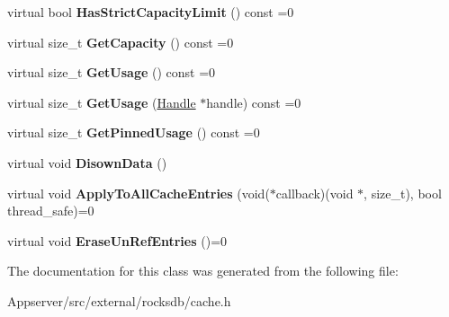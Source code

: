 \begin{DoxyCompactItemize}
\item 
virtual bool {\bfseries Has\+Strict\+Capacity\+Limit} () const =0\hypertarget{classrocksdb_1_1Cache_ae54a9d537e7f71412a0c77f5aef21746}{}\label{classrocksdb_1_1Cache_ae54a9d537e7f71412a0c77f5aef21746}

\item 
virtual size\+\_\+t {\bfseries Get\+Capacity} () const =0\hypertarget{classrocksdb_1_1Cache_accff305fc4e6553a09fe543b7fed62d4}{}\label{classrocksdb_1_1Cache_accff305fc4e6553a09fe543b7fed62d4}

\item 
virtual size\+\_\+t {\bfseries Get\+Usage} () const =0\hypertarget{classrocksdb_1_1Cache_ab37eee9208f9fee29c929e47e3f9d9b8}{}\label{classrocksdb_1_1Cache_ab37eee9208f9fee29c929e47e3f9d9b8}

\item 
virtual size\+\_\+t {\bfseries Get\+Usage} (\hyperlink{structrocksdb_1_1Cache_1_1Handle}{Handle} $\ast$handle) const =0\hypertarget{classrocksdb_1_1Cache_a5130bfdcc04fe4e3485261058e6fb1de}{}\label{classrocksdb_1_1Cache_a5130bfdcc04fe4e3485261058e6fb1de}

\item 
virtual size\+\_\+t {\bfseries Get\+Pinned\+Usage} () const =0\hypertarget{classrocksdb_1_1Cache_ade4d9d95b99efa035727abaa29350625}{}\label{classrocksdb_1_1Cache_ade4d9d95b99efa035727abaa29350625}

\item 
virtual void {\bfseries Disown\+Data} ()\hypertarget{classrocksdb_1_1Cache_ad91007b91bd80c31bc6aac392874ba19}{}\label{classrocksdb_1_1Cache_ad91007b91bd80c31bc6aac392874ba19}

\item 
virtual void {\bfseries Apply\+To\+All\+Cache\+Entries} (void($\ast$callback)(void $\ast$, size\+\_\+t), bool thread\+\_\+safe)=0\hypertarget{classrocksdb_1_1Cache_a83bf8ca591a3b1fddb503c6f2fbe0994}{}\label{classrocksdb_1_1Cache_a83bf8ca591a3b1fddb503c6f2fbe0994}

\item 
virtual void {\bfseries Erase\+Un\+Ref\+Entries} ()=0\hypertarget{classrocksdb_1_1Cache_a045e94f30862a1821358a9fb277eba0e}{}\label{classrocksdb_1_1Cache_a045e94f30862a1821358a9fb277eba0e}

\end{DoxyCompactItemize}


The documentation for this class was generated from the following file\+:\begin{DoxyCompactItemize}
\item 
Appserver/src/external/rocksdb/cache.\+h\end{DoxyCompactItemize}
